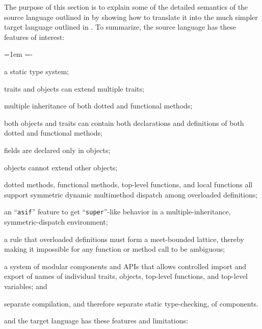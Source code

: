 The purpose of this section is to explain some of the detailed semantics
of the source language outlined in  by showing
how to translate it into the much simpler target language outlined
in .  To summarize, the source language has
these features of interest:
\begin{trivlist}\leftskip=1em \itemindent=-\leftskip
\item[] a static type system;
\item[] traits and objects can extend multiple traits;
\item[] multiple inheritance of both dotted and functional methods;
\item[] both objects and traits can contain both declarations and definitions of both dotted and functional methods;
\item[] fields are declared only in objects;
\item[] objects cannot extend other objects;
\item[] dotted methods, functional methods, top-level functions, and local functions all support symmetric dynamic multimethod dispatch among overloaded definitions;
\item[] an ``{\tt asif}'' feature to get ``{\tt super}''-like behavior in a multiple-inheritance, symmetric-dispatch environment;
\item[] a rule that overloaded definitions must form a meet-bounded lattice, thereby making it impossible for any function or method call to be ambiguous;
\item[] a system of modular components and APIs that allows controlled import and export of names of individual traits, objects, top-level functions, and top-level variables; and
\item[] separate compilation, and therefore separate static type-checking, of components.
\end{trivlist}
and the target language has these features and limitations:
